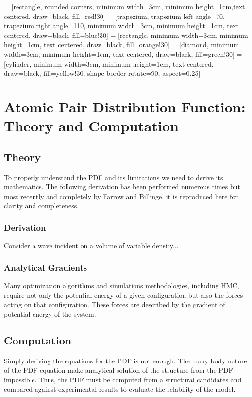  = [rectangle, rounded corners, minimum width=3cm, minimum height=1cm,text centered, draw=black, fill=red!30]
 = [trapezium, trapezium left angle=70, trapezium right angle=110, minimum width=3cm, minimum height=1cm, text centered, draw=black, fill=blue!30]
 = [rectangle, minimum width=3cm, minimum height=1cm, text centered, draw=black, fill=orange!30]
 = [diamond, minimum width=3cm, minimum height=1cm, text centered, draw=black, fill=green!30]
\usetikzlibrary{shapes.geometric}
 = [cylinder, minimum width=3cm, minimum height=1cm, text centered, draw=black, fill=yellow!30, shape border rotate=90, aspect=0.25]
\chapter{Atomic Pair Distribution Function: \\Theory and Computation}
\section{Theory}
To properly understand the PDF and its limitations we need to derive its mathematics.
The following derivation has been performed numerous times but most recently and completely by Farrow and Billinge, it is reproduced here for clarity and completeness.
\subsection{Derivation}
Consider a wave incident on a volume of variable density...
\subsection{Analytical Gradients}
Many optimization algorithms and simulations methodologies, including HMC, require not only the potential energy of a given configuration but also the forces acting on that configuration.
These forces are described by the gradient of potential energy of the system.

\section{Computation}
Simply deriving the equations for the PDF is not enough.
The many body nature of the PDF equation make analytical solution of the structure from the PDF impossible.
Thus, the PDF must be computed from a structural candidates and compared against experimental results to evaluate the relability of the model.

